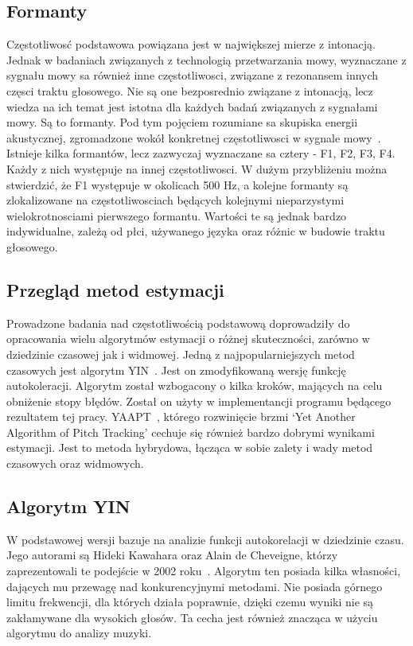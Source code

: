 \documentclass[a4paper,12 pt]{report}
\begin{document}
\subsection{Formanty}
Częstotliwosć podstawowa powiązana jest w największej mierze z intonacją. Jednak w badaniach związanych z technologią przetwarzania mowy, wyznaczane z sygnału mowy sa również inne częstotliwosci, związane z rezonansem innych częsci traktu głosowego. Nie są one bezposrednio związane z intonacją, lecz wiedza na ich temat jest istotna dla każdych badań związanych z sygnałami mowy. Są to formanty. Pod tym pojęciem rozumiane sa skupiska energii akustycznej, zgromadzone wokół konkretnej częstotliwosci w sygnale mowy~\cite{formant}. Istnieje kilka formantów, lecz zazwyczaj wyznaczane sa cztery - F1, F2, F3, F4. Każdy z nich występuje na innej częstotliwosci. W dużym przybliżeniu można stwierdzić, że F1 występuje w okolicach 500 Hz, a kolejne formanty są zlokalizowane na częstotliwosciach będących kolejnymi nieparzystymi wielokrotnosciami pierwszego formantu. Wartości te są jednak bardzo indywidualne, zależą od płci, używanego języka oraz różnic w budowie traktu głosowego.
\subsection{Przegląd metod estymacji}
Prowadzone badania nad częstotliwością podstawową doprowadziły do opracowania wielu algorytmów estymacji o różnej skuteczności, zarówno w dziedzinie czasowej jak i widmowej.
Jedną z najpopularniejszych metod czasowych jest algorytm YIN~\cite{YIN}. Jest on zmodyfikowaną wersję funkcję autokoleracji. Algorytm został wzbogacony o kilka kroków, mających na celu obniżenie stopy błędów. Został on użyty w implementancji programu będącego rezultatem tej pracy.
YAAPT~\cite{YAAPT}, którego rozwinięcie brzmi `Yet Another Algorithm of Pitch Tracking'  cechuje się również bardzo dobrymi wynikami estymacji. Jest to metoda hybrydowa, łącząca w sobie zalety i wady metod czasowych oraz widmowych.
 
\subsection{Algorytm YIN}

W podstawowej wersji bazuje na analizie funkcji autokorelacji w dziedzinie czasu. Jego autorami są Hideki Kawahara oraz Alain de Cheveigne, którzy zaprezentowali te podejście w 2002 roku~\cite{YIN}. Algorytm ten posiada kilka własności, dających mu przewagę nad konkurencyjnymi metodami. Nie posiada górnego limitu frekwencji, dla których działa poprawnie, dzięki czemu wyniki nie są zakłamywane dla wysokich głosów. Ta cecha jest również znacząca w użyciu algorytmu do analizy muzyki. 
\end{document}
